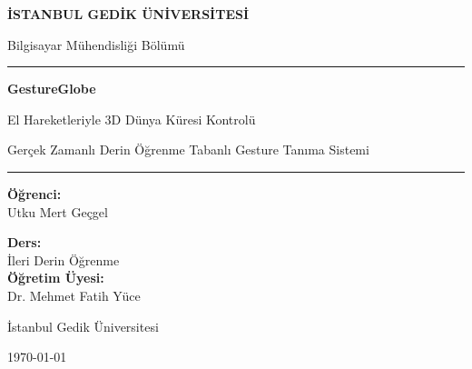 \documentclass[12pt,a4paper]{article}
\begin{document}
\begin{titlepage}
    \centering
    \vspace*{1cm}

    {\Large \textbf{İSTANBUL GEDİK ÜNİVERSİTESİ} \par}
    \vspace{0.3cm}
    {\large Bilgisayar Mühendisliği Bölümü \par}

    \vspace{2cm}
    \rule{\textwidth}{1.5pt}
    \vspace{0.5cm}

    {\Huge \textbf{GestureGlobe} \par}
    \vspace{0.4cm}
    {\LARGE El Hareketleriyle 3D Dünya Küresi Kontrolü \par}
    \vspace{0.3cm}
    {\large Gerçek Zamanlı Derin Öğrenme Tabanlı Gesture Tanıma Sistemi \par}

    \vspace{0.5cm}
    \rule{\textwidth}{1.5pt}

    \vspace{2cm}

    \begin{minipage}{0.45\textwidth}
        \begin{flushleft}
            \textbf{Öğrenci:} \\
            Utku Mert Geçgel
        \end{flushleft}
    \end{minipage}
    \hfill
    \begin{minipage}{0.45\textwidth}
        \begin{flushright}
            \textbf{Ders:} \\
            İleri Derin Öğrenme \\[0.5em]
            \textbf{Öğretim Üyesi:} \\
            Dr. Mehmet Fatih Yüce
        \end{flushright}
    \end{minipage}

    \vfill
    {\large İstanbul Gedik Üniversitesi \par}
    {\large \today \par}
\end{titlepage}
\end{document}
